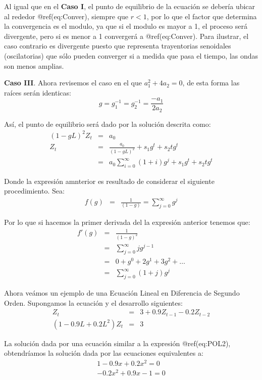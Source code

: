 \documentclass[
  a4paper,
]{article}
\begin{document}
Al igual que en el \textbf{Caso I}, el punto de equilibrio de la
ecuación se debería ubicar al rededor @ref(eq:Conver), siempre que
\(r < 1\), por lo que el factor que determina la convergencia es el
modulo, ya que si el modulo es mayor a 1, el proceso será divergente,
pero si es menor a 1 convergerá a @ref(eq:Conver). Para ilustrar, el
caso contrario es divergente puesto que representa trayentorias
senoidales (oscilatorias) que sólo pueden converger si a medida que pasa
el tiempo, las ondas son menos amplias.

\textbf{Caso III}. Ahora revisemos el caso en el que
\(a_1^2 + 4a_2 = 0\), de esta forma las raíces serán identicas: \[
    g = g_1^{-1} = g_2^{-1} = \frac{-a_1}{2 a_2}
\]

Así, el punto de equilibrio será dado por la solución descrita como:
\begin{eqnarray}
    (1 - g L)^2 Z_t & = & a_0 \nonumber \\
    Z_t & = & \frac{a_0}{(1 - g L)^2} + s_1 g^t + s_2 t g^t \nonumber \\
    & = & a_0 \sum_{i = 0}^{\infty} (1 + i) g^j + s_1 g^t + s_2 t g^t
\end{eqnarray}

Donde la expresión amnterior es resultado de considerar el siguiente
procedimiento. Sea: \begin{eqnarray}
    f(g) & = & \frac{1}{(1 - g)} = \sum_{j = 0}^{\infty} g^j \nonumber
\end{eqnarray}

Por lo que si hacemos la primer derivada del la expresión anterior
tenemos que: \begin{eqnarray}
    f'(g) & = & \frac{1}{(1 - g)^2} \nonumber \\
    & = & \sum_{j = 0}^{\infty} j g^{j-1} \nonumber \\
    & = & 0 + g^0 + 2 g^1 + 3 g^2 + \ldots \nonumber \\
    & = & \sum_{j = 0}^{\infty} (1 + j) g^j \nonumber
\end{eqnarray}

Ahora veámos un ejemplo de una Ecuación Lineal en Diferencia de Segundo
Orden. Supongamos la ecuación y el desarrollo siguientes:
\begin{eqnarray}
    Z_t & = & 3 + 0.9 Z_{t-1} - 0.2 Z_{t-2} \nonumber \\
    (1 - 0.9 L + 0.2 L^2) Z_t & = & 3 \nonumber
\end{eqnarray}

La solución dada por una ecuación similar a la expresión @ref(eq:POL2),
obtendríamos la solución dada por las ecuaciones equivalentes a:
\begin{eqnarray}
    1 - 0.9 x + 0.2 x^2 = 0 \nonumber \\
    - 0.2 x^2 + 0.9 x - 1 = 0 \nonumber
\end{eqnarray}
\end{document}
